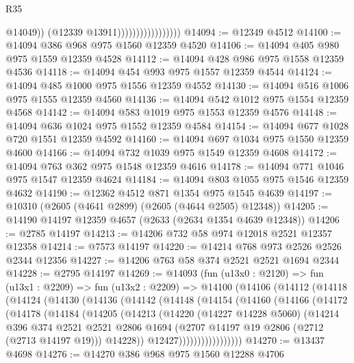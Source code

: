 \begin{lexlean}{R35}
\begin{coremodule}
                                        @14049))
                                    (@12339 @13911)))))))))))))))))
@14094 := @12349 @4512
@14100 := @14094 @386 @968 @975 @1560 @12359 @4520
@14106 := @14094 @405 @980 @975 @1559 @12359 @4528
@14112 := @14094 @428 @986 @975 @1558 @12359 @4536
@14118 := @14094 @454 @993 @975 @1557 @12359 @4544
@14124 := @14094 @485 @1000 @975 @1556 @12359 @4552
@14130 := @14094 @516 @1006 @975 @1555 @12359 @4560
@14136 := @14094 @542 @1012 @975 @1554 @12359 @4568
@14142 := @14094 @583 @1019 @975 @1553 @12359 @4576
@14148 := @14094 @636 @1024 @975 @1552 @12359 @4584
@14154 := @14094 @677 @1028 @720 @1551 @12359 @4592
@14160 := @14094 @697 @1034 @975 @1550 @12359 @4600
@14166 := @14094 @732 @1039 @975 @1549 @12359 @4608
@14172 := @14094 @763 @362 @975 @1548 @12359 @4616
@14178 := @14094 @771 @1046 @975 @1547 @12359 @4624
@14184 := @14094 @803 @1055 @975 @1546 @12359 @4632
@14190 := @12362 @4512 @871 @1354 @975 @1545 @4639
@14197 := @10310 (@2605 (@4641 @2899) (@2605 (@4644 @2505) @12348))
@14205 := @14190 @14197 @12359 @4657 (@2633 (@2634 @1354 @4639 @12348))
@14206 := @2785 @14197
@14213 := @14206 @732 @58 @974 @12018 @2521 @12357 @12358
@14214 := @7573 @14197
@14220 := @14214 @768 @973 @2526 @2526 @2344 @12356
@14227 := @14206 @763 @58 @374 @2521 @2521 @1694 @2344
@14228 := @2795 @14197
@14269 := @14093
    (fun (u13x0 : @2120) =>
    fun (u13x1 : @2209) =>
    fun (u13x2 : @2209) =>
    @14100
      (@14106
        (@14112
          (@14118
            (@14124
              (@14130
                (@14136
                  (@14142
                    (@14148
                      (@14154
                        (@14160
                          (@14166
                            (@14172
                              (@14178
                                (@14184
                                  (@14205
                                    (@14213
                                      (@14220
                                        (@14227 @14228 @5060)
                                        (@14214
                                          @396
                                          @374
                                          @2521
                                          @2521
                                          @2806
                                          @1694
                                          (@2707 @14197 @19 @2806 (@2712 (@2713 @14197 @19)))
                                          @14228))
                                      @12427)))))))))))))))))
@14270 := @13437 @4698
@14276 := @14270 @386 @968 @975 @1560 @12288 @4706

\end{coremodule}
\end{lexlean}
